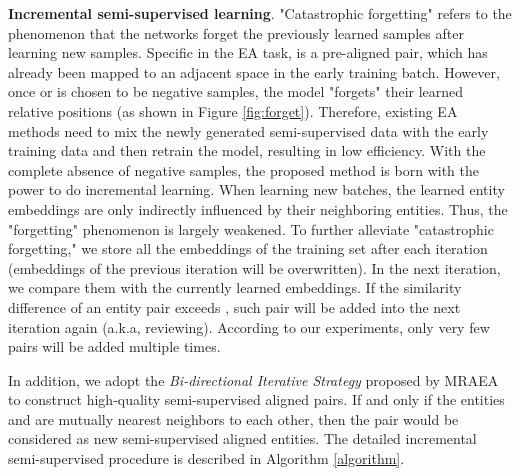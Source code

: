 \documentclass[sigconf]{acmart}
\begin{document}
\vspace{0.5em}
\noindent
\textbf{Incremental semi-supervised learning}.
"Catastrophic forgetting" refers to the phenomenon that the networks forget the previously learned samples after learning new samples.
Specific in the EA task,  is a pre-aligned pair, which has already been mapped to an adjacent space in the early training batch.
However, once  or  is chosen to be negative samples, the model "forgets" their learned relative positions (as shown in Figure \ref{fig:forget}).
Therefore, existing EA methods need to mix the newly generated semi-supervised data with the early training data and then retrain the model, resulting in low efficiency.
With the complete absence of negative samples, the proposed method is born with the power to do incremental learning.
When learning new batches, the learned entity embeddings are only indirectly influenced by their neighboring entities.
Thus, the "forgetting" phenomenon is largely weakened.
To further alleviate "catastrophic forgetting," we store all the embeddings of the training set after each iteration (embeddings of the previous iteration will be overwritten).
In the next iteration, we compare them with the currently learned embeddings.
If the similarity difference of an entity pair exceeds , such pair will be added into the next iteration again (a.k.a, reviewing).
According to our experiments, only very few pairs will be added multiple times.

In addition, we adopt the \emph{Bi-directional Iterative Strategy } proposed by MRAEA \cite{DBLP:conf/wsdm/MaoWXLW20} to construct high-quality semi-supervised aligned pairs.
If and only if the entities  and  are mutually nearest neighbors to each other, then the pair  would be considered as new semi-supervised aligned entities.
The detailed incremental semi-supervised procedure is described in Algorithm \ref{algorithm}.
\end{document}
